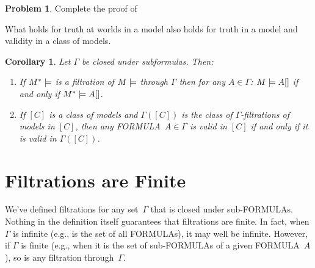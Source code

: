 \documentclass[10pt,a4paper]{article}
\makeatletter
\newcommand*{\olup}[1]{\MakeUppercase{#1}}
\theoremstyle{plain}
\newtheorem{cor}[thm]{Corollary}
\theoremstyle{definition}
\newtheorem{prob}{Problem}[section]
\theoremstyle{remark}
\newcommand*{\olfileid}[3]{}
\newcommand*{\olsection}[1]{\section*{#1}}
\newcommand*{\olchapter}[3]{}
\newcommand*{\olimport}[1]{}
\newcommand{\olref}{\@ifnextchar[{\olref@i}{\olref@final}}
\def\olref@i[#1]{\@ifnextchar[{\olref@ii}{\olref@final}}
\def\olref@ii[#1]{\@ifnextchar[{\olref@iii}{\olref@final}}
\def\olref@iii[#1]{\olref@final}
\def\olref@final#1{\ref{#1}}
\providecommand{\mSat}[3]{\ensuremath{#1 \models #2[#3]}}
\providecommand{\mModel}[2]{\ensuremath{#1 \models #2}}
\providecommand{\mClass}[1]{[#1]}
\makeatother
\begin{document}
\begin{prob}
  Complete the proof of \olref[nml][fil][fil]{thm:filtrations}
\end{prob}

What holds for truth at worlds in a model also holds for truth in a
model and validity in a class of models.

\begin{cor}
  Let $\Gamma$ be closed under subformulas. Then:
  \begin{enumerate}
  \item If $\mModel{M^*}$ is a filtration of $\mModel{M}$ through
    $\Gamma$ then for any $A \in \Gamma$: $\mSat{M}{A}$ if and only
    if $\mSat{M^*}{A}$.
  \item If $\mClass{C}$ is a class of models and $\Gamma(\mClass{C})$
    is the class of $\Gamma$-filtrations of models in $\mClass{C}$,
    then any \olup{formula}~$A \in \Gamma$ is valid in $\mClass{C}$ if
    and only if it is valid in $\Gamma(\mClass{C})$.
  \end{enumerate}
\end{cor}







\olchapter{nml}{fil}{Filtrations and Decidability}

\olimport{introduction}
\olimport{preliminaries}
\olimport{filtrations-def}
\olimport{examples-of-filtrations}
\olimport{finite}
\olimport{S5-fmp}
\olimport{S5-decidable}
\olimport{more-filtrations}
\olimport{euclidean-filtrations}

\OLEndChapterHook






\olfileid{nml}{fil}{fin}

\olsection{Filtrations are Finite}

We've defined filtrations for any set~$\Gamma$ that is closed under
sub-\olup{formula}s. Nothing in the definition itself guarantees that
filtrations are finite. In fact, when $\Gamma$ is infinite (e.g., is
the set of all \olup{formula}s), it may well be infinite. However, if
$\Gamma$ is finite (e.g., when it is the set of sub-\olup{formula}s of a
given \olup{formula}~$A$), so is any filtration through~$\Gamma$.
\end{document}
